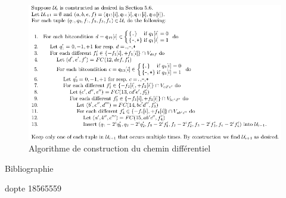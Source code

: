\documentclass[a4paper,11pt,french]{article}
\begin{document}
\begin{figure}
  \includegraphics[scale=.61]{./pics/ui.png}
  \caption{Algorithme de construction du chemin différentiel}
\end{figure}


\newpage
\large{Bibliographie}




dopte 18565559
\end{document}
